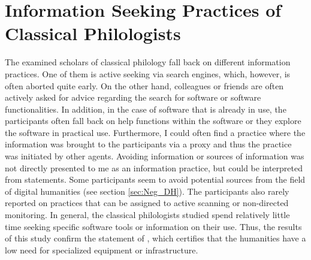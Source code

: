\documentclass[12pt, a4paper, titlepage, oneside, abstract=true, toc=listof, toc=bibliography, BCOR=1cm]{scrreprt}
\begin{document}
{\section{Information Seeking Practices of Classical Philologists}
\label{sec:Disc_ISP}
The examined scholars of classical philology fall back on different information practices. One of them is active seeking via search engines, which, however, is often aborted quite early. On the other hand, colleagues or friends are often actively asked for advice regarding the search for software or software functionalities. In addition, in the case of software that is already in use, the participants often fall back on help functions within the software or they explore the software in practical use. Furthermore, I could often find a practice where the information was brought to the participants via a proxy and thus the practice was initiated by other agents. Avoiding information or sources of information was not directly presented to me as an information practice, but could be interpreted from statements. Some participants seem to avoid potential sources from the field of digital humanities (see section \ref{sec:Neg_DH}). The participants also rarely reported on practices that can be assigned to active scanning or non-directed monitoring. In general, the classical philologists studied spend relatively little time seeking specific software tools or information on their use. Thus, the results of this study confirm the statement of \citet[p. 808]{Given2018}, which certifies that the humanities have a low need for specialized equipment or infrastructure. 

}
\end{document}

